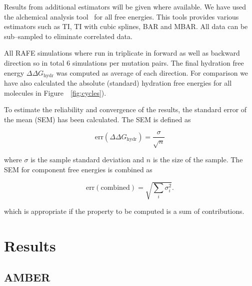 \documentclass[journal=jctcce,manuscript=article]{achemso}
\begin{document}
Results from additional estimators
will be given where available.  We have used the alchemical analysis
tool~\cite{klimovich_guidelines_2015} for all free energies.  This
tools provides various estimators such as TI, TI with cubic splines,
BAR and MBAR.  All data can be sub--sampled to eliminate correlated
data.

All RAFE simulations where run in triplicate in forward as well as
backward direction so in total 6 simulations per mutation pairs.  The
final hydration free energy $\Delta\Delta G_{\mathrm{hydr}}$ was
computed as average of each direction.  For comparison we have also
calculated the absolute (standard) hydration free energies for all
molecules in Figure~~\ref{fig:cycles}).

To estimate the reliability and convergence of the results, the
standard error of the mean (SEM) has been calculated.  The SEM is
defined as

\begin{equation}
  \label{eq:sem}
  \mathrm{err}(\Delta\Delta G_{\mathrm{hydr}}) = \frac{\sigma}{\sqrt{n}}
\end{equation}

where $\sigma$ is the sample standard deviation and $n$ is the size of
the sample.  The SEM for component free energies is combined as

\begin{equation}
  \label{eq:sem-comb}
  \mathrm{err}(\mathrm{combined}) = \sqrt{\sum_i \sigma_i^2}.
\end{equation}

which is appropriate if the property to be computed is a sum of
contributions.


\section{Results}
\label{sec:results}



\subsection{AMBER}
\label{sec:amber-results}
\end{document}

